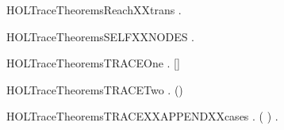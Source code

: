 \newcommand{\HOLTraceTheoremsReachXXstrongindXXright}{\UseVerbatim{HOLTraceTheoremsReachXXstrongindXXright}}
\begin{SaveVerbatim}{HOLTraceTheoremsReachXXtrans}
\HOLTokenTurnstile{} \HOLSymConst{\HOLTokenForall{}}  .    \HOLSymConst{\HOLTokenConj{}}    \HOLSymConst{\HOLTokenImp{}}   
\end{SaveVerbatim}
\newcommand{\HOLTraceTheoremsReachXXtrans}{\UseVerbatim{HOLTraceTheoremsReachXXtrans}}
\begin{SaveVerbatim}{HOLTraceTheoremsSELFXXNODES}
\HOLTokenTurnstile{} \HOLSymConst{\HOLTokenForall{}}.  \HOLConst{\HOLTokenIn{}}  
\end{SaveVerbatim}
\newcommand{\HOLTraceTheoremsSELFXXNODES}{\UseVerbatim{HOLTraceTheoremsSELFXXNODES}}
\begin{SaveVerbatim}{HOLTraceTheoremsTRACEOne}
\HOLTokenTurnstile{} \HOLSymConst{\HOLTokenForall{}}  .  \HOLTokenTransBegin{}\HOLTokenTransEnd {} \HOLSymConst{\HOLTokenImp{}}   [] 
\end{SaveVerbatim}
\newcommand{\HOLTraceTheoremsTRACEOne}{\UseVerbatim{HOLTraceTheoremsTRACEOne}}
\begin{SaveVerbatim}{HOLTraceTheoremsTRACETwo}
\HOLTokenTurnstile{} \HOLSymConst{\HOLTokenForall{}}    .  \HOLTokenTransBegin{}\HOLTokenTransEnd {} \HOLSymConst{\HOLTokenConj{}}     \HOLSymConst{\HOLTokenImp{}}   (\HOLSymConst{::}) 
\end{SaveVerbatim}
\newcommand{\HOLTraceTheoremsTRACETwo}{\UseVerbatim{HOLTraceTheoremsTRACETwo}}
\begin{SaveVerbatim}{HOLTraceTheoremsTRACEXXAPPENDXXcases}
\HOLTokenTurnstile{} \HOLSymConst{\HOLTokenForall{}}   .
         ( \HOLSymConst{++} )  \HOLSymConst{\HOLTokenEquiv{}} \HOLSymConst{\HOLTokenExists{}}.     \HOLSymConst{\HOLTokenConj{}}    
\end{SaveVerbatim}
